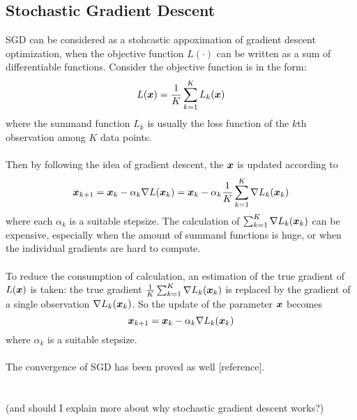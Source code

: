 \documentclass[11pt]{article}
\begin{document}
    \subsection{Stochastic Gradient Descent}
        SGD can be considered as a stohcastic appoximation of gradient descent optimization, 
        when the objective function $L(\cdot)$ can be written as a sum of differentiable functions.
        Consider the objective function is in the form:
        $$
        L(\bm{x}) =\frac{1}{K} \sum_{k=1}^{K} L_k (\bm{x})
        $$
        where the summand function $L_k$ is usually the loss function of the $k$th observation among
        $K$ data points.
        \\\\
        Then by following the idea of gradient descent, the $\bm{x}$ is updated according to
        $$
        \bm{x}_{k+1} = \bm{x}_{k} -\alpha_k \nabla L(\bm{x}_k) = \bm{x}_{k} -\alpha_k \frac{1}{K}\sum_{k=1}^{K} \nabla L_k(\bm{x}_k)
        $$
        where each $\alpha_k$ is a suitable stepsize. The calculation of $\sum_{k=1}^{K} \nabla L_k(\bm{x}_k)$ can be
        expensive, especially when the amount of summand functions is huge, or when the individual gradients are hard to
        compute. 
        \\\\
        To reduce the consumption of calculation, an estimation of the true gradient of $L(\bm{x})$ is taken: 
        the true gradient $\frac{1}{K} \sum_{k=1}^{K} \nabla L_k(\bm{x}_k)$ is replaced by the gradient of a single observation $\nabla L_k(\bm{x}_k)$. 
        So the update of the parameter $\bm{x}$ becomes
        $$
        \bm{x}_{k+1} = \bm{x}_{k} - \alpha_k \nabla L_k(\bm{x}_k)        
        $$
        where $\alpha_k$ is a suitable stepsize. 
        \\\\
        The convergence of SGD has been proved as well{\color{red} [reference]}. 
        \\\\\\
        (and should I explain more about why stochastic gradient descent works?)
\end{document}
